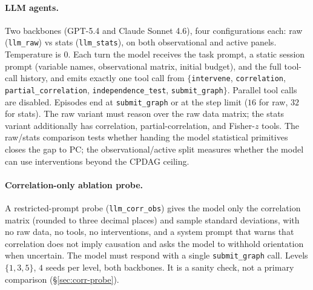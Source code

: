 \paragraph{LLM agents.} Two backbones (GPT-5.4 and Claude Sonnet 4.6), four configurations each: raw (\texttt{llm\_raw}) vs stats (\texttt{llm\_stats}), on both observational and active panels. Temperature is $0$. Each turn the model receives the task prompt, a static session prompt (variable names, observational matrix, initial budget), and the full tool-call history, and emits exactly one tool call from $\{$\texttt{intervene}, \texttt{correlation}, \texttt{partial\_correlation}, \texttt{independence\_test}, \texttt{submit\_graph}$\}$. Parallel tool calls are disabled. Episodes end at \texttt{submit\_graph} or at the step limit ($16$ for raw, $32$ for stats). The raw variant must reason over the raw data matrix; the stats variant additionally has correlation, partial-correlation, and Fisher-$z$ tools. The raw/stats comparison tests whether handing the model statistical primitives closes the gap to PC; the observational/active split measures whether the model can use interventions beyond the CPDAG ceiling.

\paragraph{Correlation-only ablation probe.} A restricted-prompt probe (\texttt{llm\_corr\_obs}) gives the model only the correlation matrix (rounded to three decimal places) and sample standard deviations, with no raw data, no tools, no interventions, and a system prompt that warns that correlation does not imply causation and asks the model to withhold orientation when uncertain. The model must respond with a single \texttt{submit\_graph} call. Levels $\{1, 3, 5\}$, $4$ seeds per level, both backbones. It is a sanity check, not a primary comparison (\S\ref{sec:corr-probe}).
